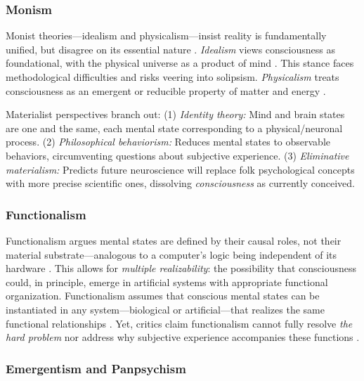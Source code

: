 \subsubsection{Monism}

Monist theories---idealism and physicalism---insist reality is fundamentally unified, but disagree on its essential nature \cite{reggia2013rise}. \emph{Idealism} views consciousness as foundational, with the physical universe as a product of mind \cite{goswami1993self,hutto1998presence}. This stance faces methodological difficulties and risks veering into solipsism. \emph{Physicalism} treats consciousness as an emergent or reducible property of matter and energy \cite{churchland1999engine,searle2004turn}.

Materialist perspectives branch out: (1) \emph{Identity theory:} Mind and brain states are one and the same, each mental state corresponding to a physical/neuronal process. (2) \emph{Philosophical behaviorism:} Reduces mental states to observable behaviors, circumventing questions about subjective experience. (3) \emph{Eliminative materialism:} Predicts future neuroscience will replace folk psychological concepts with more precise scientific ones, dissolving \emph{consciousness} as currently conceived.

\subsubsection{Functionalism}

Functionalism argues mental states are defined by their causal roles, not their material substrate---analogous to a computer's logic being independent of its hardware \cite{churchland1999engine,searle2004arguments}. This allows for \emph{multiple realizability}: the possibility that consciousness could, in principle, emerge in artificial systems with appropriate functional organization. Functionalism assumes that conscious mental states can be instantiated in any system---biological or artificial---that realizes the same functional relationships \cite{reggia2013rise}. Yet, critics claim functionalism cannot fully resolve \emph{the hard problem} nor address why subjective experience accompanies these functions \cite{garridomerchan2024machine,levine1983materialism}.

\subsubsection{Emergentism and Panpsychism}

